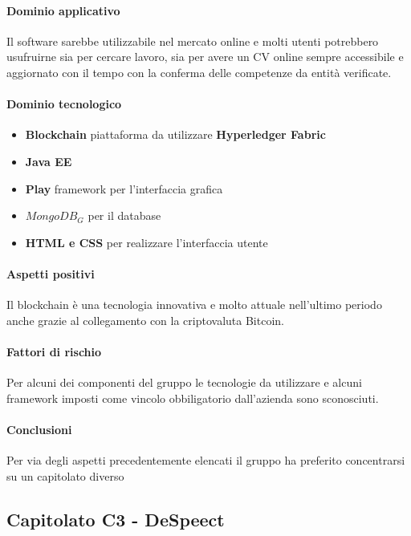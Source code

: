 	\paragraph{Dominio applicativo} \Spazio
	Il software sarebbe utilizzabile nel mercato online e molti utenti potrebbero usufruirne sia per cercare lavoro, sia per avere un CV online sempre accessibile e aggiornato con il tempo con la conferma delle competenze da entità verificate.
	\paragraph{Dominio tecnologico} \Spazio
	\begin{itemize}
		\item \textbf{Blockchain} piattaforma da utilizzare \textbf{Hyperledger Fabric}
		\item  \textbf{Java EE}
		\item  \textbf{Play} framework per l'interfaccia grafica
		\item  \textbf{$MongoDB_G$} per il database
		\item  \textbf{HTML e CSS} per realizzare l'interfaccia utente	
	\end{itemize}
	
	\paragraph{Aspetti positivi} \Spazio
	Il blockchain è una tecnologia innovativa e molto attuale nell'ultimo periodo anche grazie al collegamento con la criptovaluta Bitcoin. 
	\paragraph{Fattori di rischio} \Spazio
	Per alcuni dei componenti del gruppo le tecnologie da utilizzare e alcuni framework imposti come vincolo obbiligatorio dall'azienda sono sconosciuti.
	\paragraph{Conclusioni} \Spazio
	Per via degli aspetti precedentemente elencati il gruppo ha preferito concentrarsi su un capitolato diverso
	
	
	\subsection{Capitolato C3 - DeSpeect}
